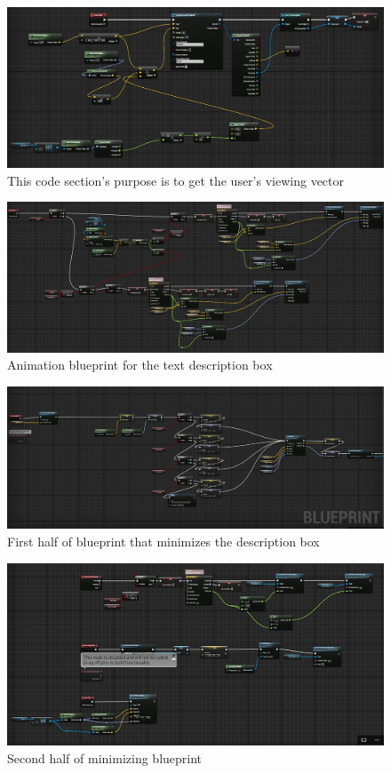 \documentclass[11pt]{book}
\begin{document}
	\begin{figure}
		\caption{This code section's purpose is to get the user's viewing vector}
		\includegraphics[scale=0.5]{TextDescription1.png}
		\centering
	\end{figure}
	\begin{figure}
		\caption{Animation blueprint for the text description box}
		\includegraphics[scale=0.5]{TextDescription2.png}
		\centering
	\end{figure}
	\begin{figure}
		\caption{First half of blueprint that minimizes the description box}
		\includegraphics[scale=0.5]{TextDescription3.png}
		\centering
	\end{figure}
	\begin{figure}
		\caption{Second half of minimizing blueprint}
		\includegraphics[scale=0.5]{TextDescription4.png}
		\centering
	\end{figure}
	
\end{document}

